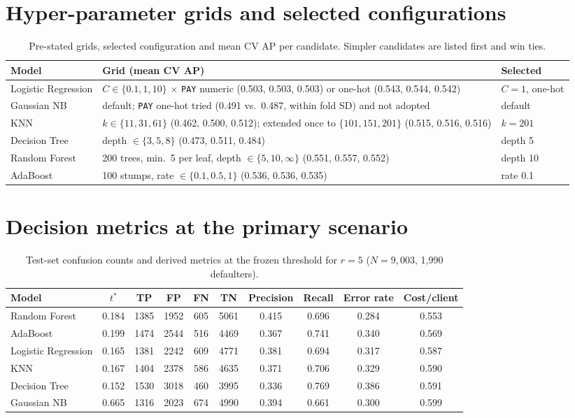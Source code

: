 \documentclass{article}
\begin{document}
\section{Hyper-parameter grids and selected configurations}
\label{app:grids}
\begin{table}[h]
  \caption{Pre-stated grids, selected configuration and mean CV AP per candidate. Simpler candidates are listed first and win ties.}
  \centering
  \small
  \begin{tabularx}{\linewidth}{@{}lXl@{}}
    \toprule
    Model & Grid (mean CV AP) & Selected \\
    \midrule
    Logistic Regression & $C\in\{0.1,1,10\}$ $\times$ \texttt{PAY} numeric (0.503, 0.503, 0.503) or one-hot (0.543, 0.544, 0.542) & $C=1$, one-hot \\
    Gaussian NB & default; \texttt{PAY} one-hot tried (0.491 vs.\ 0.487, within fold SD) and not adopted & default \\
    KNN & $k\in\{11,31,61\}$ (0.462, 0.500, 0.512); extended once to $\{101,151,201\}$ (0.515, 0.516, 0.516) & $k=201$ \\
    Decision Tree & depth $\in\{3,5,8\}$ (0.473, 0.511, 0.484) & depth 5 \\
    Random Forest & 200 trees, min.\ 5 per leaf, depth $\in\{5,10,\infty\}$ (0.551, 0.557, 0.552) & depth 10 \\
    AdaBoost & 100 stumps, rate $\in\{0.1,0.5,1\}$ (0.536, 0.536, 0.535) & rate 0.1 \\
    \bottomrule
  \end{tabularx}
\end{table}

\section{Decision metrics at the primary scenario}
\label{app:decisions}
\begin{table}[h]
  \caption{Test-set confusion counts and derived metrics at the frozen threshold for $r=5$ ($N=9{,}003$, 1{,}990 defaulters).}
  \centering
  \small
  \begin{tabular}{@{}lccccccccc@{}}
    \toprule
    Model & $t^\ast$ & TP & FP & FN & TN & Precision & Recall & Error rate & Cost/client \\
    \midrule
    Random Forest & 0.184 & 1385 & 1952 & 605 & 5061 & 0.415 & 0.696 & 0.284 & 0.553 \\
    AdaBoost & 0.199 & 1474 & 2544 & 516 & 4469 & 0.367 & 0.741 & 0.340 & 0.569 \\
    Logistic Regression & 0.165 & 1381 & 2242 & 609 & 4771 & 0.381 & 0.694 & 0.317 & 0.587 \\
    KNN & 0.167 & 1404 & 2378 & 586 & 4635 & 0.371 & 0.706 & 0.329 & 0.590 \\
    Decision Tree & 0.152 & 1530 & 3018 & 460 & 3995 & 0.336 & 0.769 & 0.386 & 0.591 \\
    Gaussian NB & 0.665 & 1316 & 2023 & 674 & 4990 & 0.394 & 0.661 & 0.300 & 0.599 \\
    \bottomrule
  \end{tabular}
\end{table}
\end{document}
